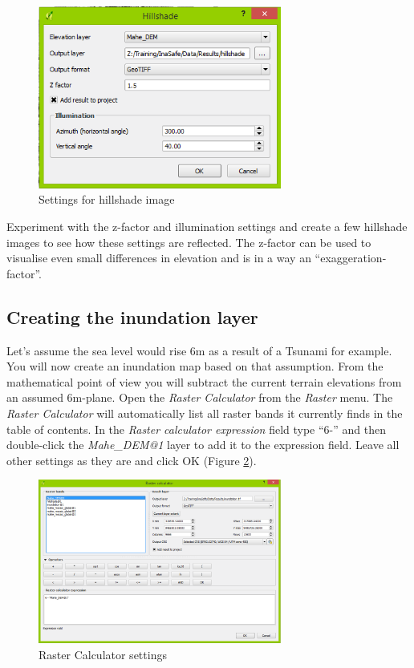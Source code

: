 \documentclass[a4paper,12pt,titlepage]{article}
\begin{document}
\begin{figure}[htb]
	\centering
	\includegraphics[width=8cm]{Images/hillshade.png}
	\caption{Settings for hillshade image}\label{fig:hillshade}
\end{figure}

Experiment with the z-factor and illumination settings and create a few hillshade images to see how these settings are reflected. The z-factor can be used to visualise even small differences in elevation and is in a way an ``exaggeration-factor''.

\subsection{Creating the inundation layer}

Let's assume the sea level would rise 6m as a result of a Tsunami for example. You will now create an inundation map based on that assumption. From the mathematical point of view you will subtract the current terrain elevations from an assumed 6m-plane. Open the \textit{Raster Calculator} from the \textit{Raster} menu. The \textit{Raster Calculator} will automatically list all raster bands it currently finds in the table of contents. In the \textit{Raster calculator expression} field type ``6-'' and then double-click the \textit{Mahe\_DEM@1} layer to add it to the expression field. Leave all other settings as they are and click OK (Figure \ref{fig:inundation1}).

\begin{figure}[htb]
	\centering
	\includegraphics[width=8cm]{Images/inundation1.png}
	\caption{Raster Calculator settings}\label{fig:inundation1}
\end{figure}
\end{document}
